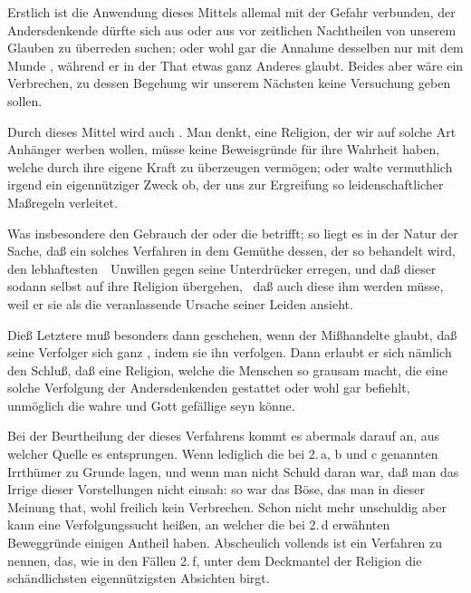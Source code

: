 \begin{aufza}
\begin{aufzb} 
\item Erstlich ist die Anwendung dieses Mittels allemal mit der Gefahr verbunden, der Andersdenkende dürfte sich aus  oder aus  vor zeitlichen Nachtheilen von unserem Glauben zu überreden suchen; oder wohl gar die Annahme desselben nur mit dem Munde , während er in der That etwas ganz Anderes glaubt. Beides aber wäre ein Verbrechen, zu dessen Begehung wir unserem Nächsten keine Versuchung geben sollen.
\item Durch dieses Mittel wird auch . Man denkt, eine Religion, der wir auf solche Art Anhänger werben wollen, müsse keine Beweisgründe für ihre Wahrheit haben, welche durch ihre eigene Kraft zu überzeugen vermögen; oder walte vermuthlich irgend ein eigennütziger Zweck ob, der uns zur Ergreifung so leidenschaftlicher Maßregeln verleitet.
\item Was insbesondere den Gebrauch der  oder die  betrifft; so liegt es in der Natur der Sache, daß ein solches Verfahren in dem Gemüthe dessen, der so behandelt wird, den lebhaftesten~\ Unwillen gegen seine Unterdrücker erregen, und daß dieser sodann selbst auf ihre Religion übergehen, \dh\ daß auch diese ihm  werden müsse, weil er sie als die veranlassende Ursache seiner Leiden ansieht.
\item Dieß Letztere muß besonders dann geschehen, wenn der Mißhandelte glaubt, daß seine Verfolger sich ganz , indem sie ihn verfolgen. Dann erlaubt er sich nämlich den Schluß, daß eine Religion, welche die Menschen so grausam macht, die eine solche Verfolgung der Andersdenkenden gestattet oder wohl gar befiehlt, unmöglich die wahre und Gott gefällige seyn könne.
\end{aufzb}
\item Bei der Beurtheilung der  dieses Verfahrens kommt es abermals darauf an, aus welcher Quelle es entsprungen. Wenn lediglich die bei 2.\,a, b und c genannten Irrthümer zu Grunde lagen, und wenn man nicht Schuld daran war, daß man das Irrige dieser Vorstellungen nicht einsah: so war das Böse, das man in dieser Meinung that, wohl freilich kein Verbrechen. Schon nicht mehr unschuldig aber kann eine Verfolgungssucht heißen, an welcher die bei 2.\,d erwähnten Beweggründe einigen Antheil haben. Abscheulich vollends ist ein Verfahren zu nennen, das, wie in den Fällen 2.\,f, unter dem Deckmantel der Religion die schändlichsten eigennützigsten Absichten birgt.
\end{aufza}

